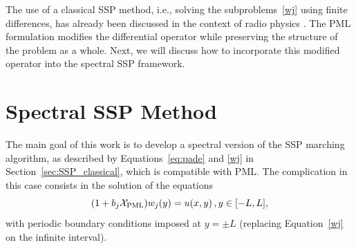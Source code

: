 \documentclass[11pt,a4paper]{article}
\newcommand{\cX}{\mathcal{X}}
\theoremstyle{plain}%
\theoremstyle{definition}
\theoremstyle{remark}
\begin{document}
The use of a classical SSP method, i.e., solving the subproblems~\eqref{wj} using finite differences, has already been discussed in the context of radio physics \cite{levy2001perfectly}.
The PML formulation modifies the differential operator while preserving the structure of the problem as a whole. 
Next, we will discuss how to incorporate this modified operator into the spectral SSP framework.


\section{Spectral SSP Method}\label{sec:sssp}
The main goal of this work is to develop a spectral version of the SSP marching algorithm, 
as described by Equations~\eqref{eq:pade} and \eqref{wj} in Section~\ref{sec:SSP_classical}, which is compatible with PML.
%
The complication in this case consists in the solution of the equations
\begin{equation}\label{wjPML}
    (1 + b_j \cX_{\rm PML}) w_j(y)= u(x,y)\,, y\in  [-L,L],
\end{equation}
with periodic boundary conditions imposed at $y=\pm L$ (replacing Equation~\eqref{wj} on the infinite interval). 
\end{document}
